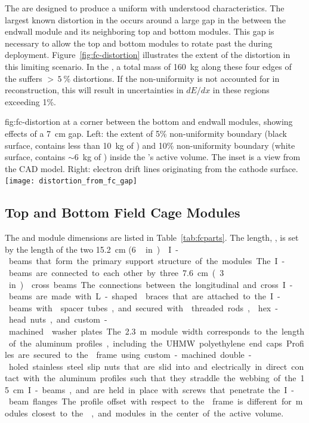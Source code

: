 The  are designed to produce a uniform \efield with understood characteristics.
The largest known \efield distortion in the  occurs around a large gap in the  between the endwall module and its neighboring top and bottom modules. This gap is necessary to allow the top and bottom modules to rotate past the  during deployment.  Figure~\ref{fig:fc-distortion} illustrates the extent of the distortion in this limiting scenario. 
In the , a total  mass of \SI{160}{kg} along these four edges of the  suffers $>\,\SI{5}{\%}$ \efield distortions.  If the non-uniformity is not accounted for in reconstruction, this will result in uncertainties in $dE/dx$ in these regions exceeding 1\%. 

\begin{dunefigure}
{fig:fc-distortion}
{\efield at a corner between the bottom and endwall  modules, showing effects of a \SI{7}{cm} gap. Left: the extent of \num{5}\% \efield{} non-uniformity boundary (black surface, contains less than \SI{10}{kg} of ) and \num{10}\% non-uniformity boundary (white surface, contains $\sim$\SI{6}{kg} of ) inside the 's active volume. The inset is a view from the CAD model.  Right: electron drift lines originating from the cathode surface.}
\texttt{[image: distortion\_from\_fc\_gap]}
\end{dunefigure}



\subsection{Top and Bottom Field Cage Modules}
\label{sec:fdsp-hv-des-fc-tbmods}

The  and  module dimensions are listed in Table~\ref{tab:fcparts}. The length, \spfcmodlen{}, is set by the length of the two \SI{15.2}{\cm} (\SI{6}\,in)  I-beams that form the primary support structure of the modules. The I-beams are connected to each other by three  \SI{7.6}{\cm} (\SI{3}\,in)  cross beams. The connections between the longitudinal and cross I-beams are made with L-shaped  braces that are attached to the I-beams with  spacer tubes, and secured with  threaded rods,  hex-head nuts, and custom-machined \frfour washer plates.

The \SI{2.3}{\m} module width corresponds to the length of the aluminum profiles, including the UHMW polyethylene end caps. Profiles are secured to the  frame using custom-machined double-holed stainless steel slip nuts that are slid into and electrically in direct contact with the aluminum profiles such that they straddle the webbing of the \SI{15}{\cm} I-beams, and are held in place with screws that penetrate the I-beam flanges. The profile offset with respect to the  frame is different for modules closest to the , %
and modules in the center of the active volume.

